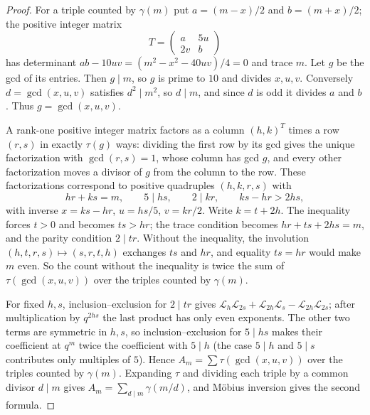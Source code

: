 \begin{proof}
For a triple counted by $\gamma(m)$ put $a=(m-x)/2$ and $b=(m+x)/2$; the positive
integer matrix
\[
  T=\begin{pmatrix}a&5u\\2v&b\end{pmatrix}
\]
has determinant $ab-10uv=(m^2-x^2-40uv)/4=0$ and trace $m$. Let $g$ be the gcd of
its entries. Then $g\mid m$, so $g$ is prime to $10$ and divides $x,u,v$.
Conversely $d=\gcd(x,u,v)$ satisfies $d^2\mid m^2$, so $d\mid m$, and since $d$ is
odd it divides $a$ and $b$. Thus $g=\gcd(x,u,v)$.

A rank-one positive integer matrix factors as a column $(h,k)^{T}$ times a row
$(r,s)$ in exactly $\tau(g)$ ways: dividing the first row by its gcd gives the
unique factorization with $\gcd(r,s)=1$, whose column has gcd $g$, and every other
factorization moves a divisor of $g$ from the column to the row. These
factorizations correspond to positive quadruples $(h,k,r,s)$ with
\[
  hr+ks=m,\qquad 5\mid hs,\qquad 2\mid kr,\qquad ks-hr>2hs,
\]
with inverse $x=ks-hr$, $u=hs/5$, $v=kr/2$. Write $k=t+2h$. The inequality forces
$t>0$ and becomes $ts>hr$; the trace condition becomes $hr+ts+2hs=m$, and the parity
condition $2\mid tr$. Without the inequality, the involution
$(h,t,r,s)\mapsto(s,r,t,h)$ exchanges $ts$ and $hr$, and equality $ts=hr$ would make
$m$ even. So the count without the inequality is twice the sum of
$\tau(\gcd(x,u,v))$ over the triples counted by $\gamma(m)$.

For fixed $h,s$, inclusion--exclusion for $2\mid tr$ gives
$\mathcal L_h\mathcal L_{2s}+\mathcal L_{2h}\mathcal L_s-\mathcal L_{2h}\mathcal L_{2s}$; after
multiplication by $q^{2hs}$ the last product has only even exponents. The other two
terms are symmetric in $h,s$, so inclusion--exclusion for $5\mid hs$ makes their
coefficient at $q^m$ twice the coefficient with $5\mid h$ (the case $5\mid h$ and $5\mid s$
contributes only multiples of $5$). Hence
$A_m=\sum\tau(\gcd(x,u,v))$ over the triples counted by $\gamma(m)$. Expanding
$\tau$ and dividing each triple by a common divisor $d\mid m$ gives
$A_m=\sum_{d\mid m}\gamma(m/d)$, and M\"obius inversion gives the second formula.
\end{proof}

